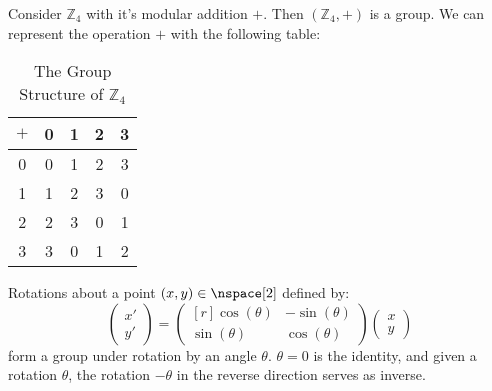         \begin{example}
            Consider $\mathbb{Z}_{4}$ with it's modular addition $+$. Then
            $(\mathbb{Z}_{4},+)$ is a group. We can represent the operation $+$
            with the following table:
            \begin{table}[H]
                \centering
                \captionsetup{type=table}
                \begin{tabular}{c|cccc}
                    $+$&0&1&2&3\\
                    \hline
                    0&0&1&2&3\\
                    1&1&2&3&0\\
                    2&2&3&0&1\\
                    3&3&0&1&2
                \end{tabular}
                \caption{The Group Structure of $\mathbb{Z}_{4}$}
            \end{table}
        \end{example}
        \begin{example}
            Rotations about a point $(x,y)\in\nspace[2]$ defined by:
            \begin{equation}
                \begin{pmatrix}
                    x'\\
                    y'
                \end{pmatrix}=
                \begin{pmatrix*}[r]
                    \cos(\theta)&\minus\sin(\theta)\\
                    \sin(\theta)&\cos(\theta)
                \end{pmatrix*}
                \begin{pmatrix}
                    x\\
                    y
                \end{pmatrix}
            \end{equation}
            form a group under rotation by an angle $\theta$. $\theta=0$ is
            the identity, and given a rotation $\theta$, the rotation
            $\minus\theta$ in the reverse direction serves as inverse.
        \end{example}
